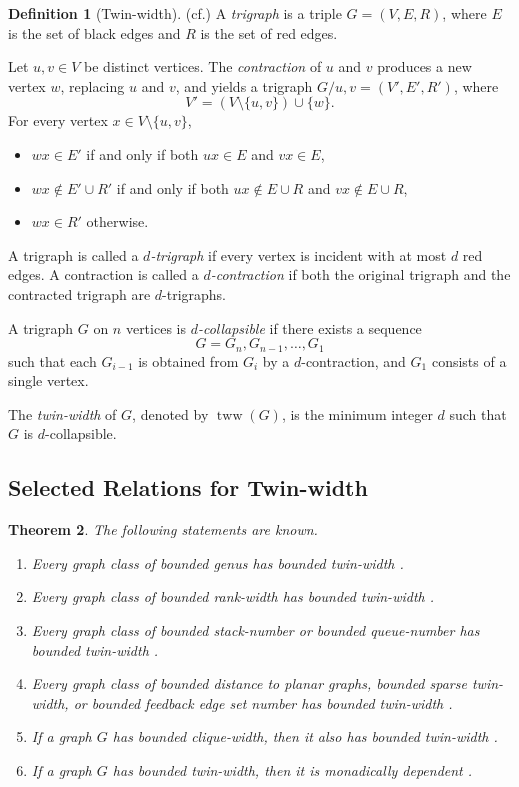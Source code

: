 \documentclass[10pt]{book}
\newtheorem{theorem}{Theorem}[section]
\theoremstyle{definition}
\newtheorem{definition}[theorem]{Definition}
\begin{document}
\begin{definition}[Twin-width]
(cf.\cite{22,23,24})
A \emph{trigraph} is a triple \(G=(V,E,R)\), where \(E\) is the set of black edges and \(R\) is the set of red edges.

Let \(u,v\in V\) be distinct vertices. The \emph{contraction} of \(u\) and \(v\) produces a new vertex \(w\), replacing \(u\) and \(v\), and yields a trigraph \(G/u,v=(V',E',R')\), where
\[
V'=(V\setminus\{u,v\})\cup\{w\}.
\]
For every vertex \(x\in V\setminus\{u,v\}\),
\begin{itemize}
    \item \(wx\in E'\) if and only if both \(ux\in E\) and \(vx\in E\),
    \item \(wx\notin E'\cup R'\) if and only if both \(ux\notin E\cup R\) and \(vx\notin E\cup R\),
    \item \(wx\in R'\) otherwise.
\end{itemize}

A trigraph is called a \emph{\(d\)-trigraph} if every vertex is incident with at most \(d\) red edges.  
A contraction is called a \emph{\(d\)-contraction} if both the original trigraph and the contracted trigraph are \(d\)-trigraphs.

A trigraph \(G\) on \(n\) vertices is \emph{\(d\)-collapsible} if there exists a sequence
\[
G=G_n,G_{n-1},\dots,G_1
\]
such that each \(G_{i-1}\) is obtained from \(G_i\) by a \(d\)-contraction, and \(G_1\) consists of a single vertex.

The \emph{twin-width} of \(G\), denoted by \(\operatorname{tww}(G)\), is the minimum integer \(d\) such that \(G\) is \(d\)-collapsible.
\end{definition}

\subsection{Selected Relations for Twin-width}

\begin{theorem}
The following statements are known.
\begin{enumerate}
    \item Every graph class of bounded genus has bounded twin-width \cite{341}.
    \item Every graph class of bounded rank-width has bounded twin-width \cite{Bonnet2020TwinwidthIT}.
    \item Every graph class of bounded stack-number or bounded queue-number has bounded twin-width \cite{bonnet2021twin}.
    \item Every graph class of bounded distance to planar graphs, bounded sparse twin-width, or bounded feedback edge set number has bounded twin-width \cite{341}.
    \item If a graph \(G\) has bounded clique-width, then it also has bounded twin-width \cite{314}.
    \item If a graph \(G\) has bounded twin-width, then it is monadically dependent \cite{314}.
\end{enumerate}
\end{theorem}
\end{document}
